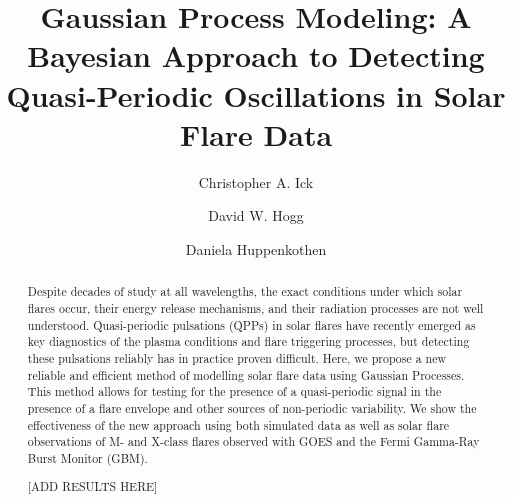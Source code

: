 \documentclass{aastex61}
\begin{document}
\title{Gaussian Process Modeling: A Bayesian Approach to Detecting Quasi-Periodic Oscillations in Solar Flare Data} \label{sec:title and authors}

\author{Christopher A. Ick}

\author{David W. Hogg}

\author{Daniela Huppenkothen}

\begin{abstract} \label{sec:abstract} 
Despite decades of study at all wavelengths, the exact conditions under which solar flares occur, their energy release mechanisms, and their radiation processes are not well understood. Quasi-periodic pulsations (QPPs) in solar flares have recently emerged as key diagnostics of the plasma conditions and flare triggering processes, but detecting these pulsations reliably has in practice proven difficult. Here, we propose a new reliable and efficient method of modelling solar flare data using Gaussian Processes. This method allows for testing for the presence of a quasi-periodic signal in the presence of a flare envelope and other sources of non-periodic variability. We show the effectiveness of the new approach using both simulated data as well as solar flare observations of M- and X-class flares observed with GOES and the Fermi Gamma-Ray Burst Monitor (GBM).

[ADD RESULTS HERE]

\end{abstract}
\end{document}
